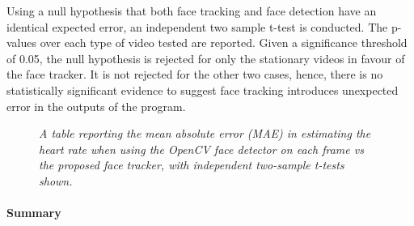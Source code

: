 Using a null hypothesis that both face tracking and face detection have an identical expected error, an independent two sample t-test is conducted. The p-values over each type of video tested are reported.
Given a significance threshold of 0.05, the null hypothesis is rejected for only the stationary videos in favour of the face tracker.
It is not rejected for the other two cases, hence, there is no statistically significant evidence to suggest face tracking introduces unexpected error in the outputs of the program.
%     
\begin{figure}[H]
    \centering
    \caption{\textit{A table reporting the mean absolute error (MAE) in estimating the heart rate when using the OpenCV face detector on each frame vs the proposed face tracker, with independent two-sample t-tests shown. }}
    \end{figure}



\paragraph{Summary}

